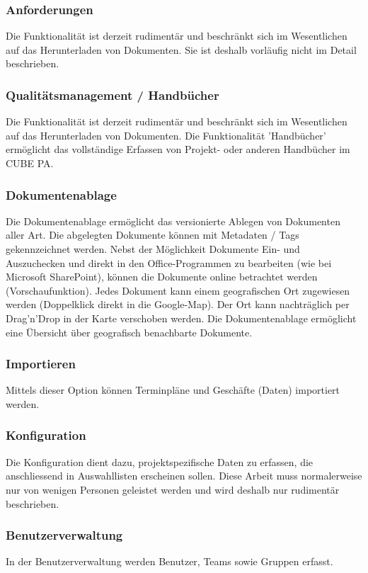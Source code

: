 \subsubsection{Anforderungen} %

Die Funktionalität ist derzeit rudimentär und beschränkt sich im Wesentlichen auf das Herunterladen von Dokumenten. Sie ist deshalb vorläufig nicht im Detail beschrieben.

\subsubsection{Qualitätsmanagement / Handbücher} %

Die Funktionalität ist derzeit rudimentär und beschränkt sich im Wesentlichen auf das Herunterladen von Dokumenten. Die Funktionalität 'Handbücher' ermöglicht das vollständige Erfassen von Projekt- oder anderen Handbücher im CUBE PA.

\subsubsection{Dokumentenablage} %

Die Dokumentenablage ermöglicht das versionierte Ablegen von Dokumenten aller Art. Die abgelegten Dokumente können mit Metadaten / Tags gekennzeichnet werden. Nebst der Möglichkeit Dokumente Ein- und Auszuchecken und direkt in den Office-Programmen zu bearbeiten (wie bei Microsoft SharePoint), können die Dokumente online betrachtet werden (Vorschaufunktion). Jedes Dokument kann einem geografischen Ort zugewiesen werden (Doppelklick direkt in die Google-Map). Der Ort kann nachträglich per Drag’n’Drop in der Karte verschoben werden. Die Dokumentenablage ermöglicht eine Übersicht über geografisch benachbarte Dokumente.

\subsubsection{Importieren} %

Mittels dieser Option können Terminpläne und Geschäfte (Daten) importiert werden.

\subsubsection{Konfiguration} %

Die Konfiguration dient dazu, projektspezifische Daten zu erfassen, die anschliessend in Auswahllisten erscheinen sollen. Diese Arbeit muss normalerweise nur von wenigen Personen geleistet werden und wird deshalb nur rudimentär beschrieben.

\subsubsection{Benutzerverwaltung} %

In der Benutzerverwaltung werden Benutzer, Teams sowie Gruppen erfasst.

